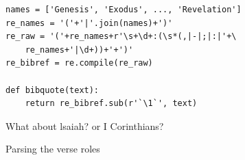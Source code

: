 \documentclass{beamer}
\begin{document}
\begin{frame}[fragile]
    
\begin{verbatim}
names = ['Genesis', 'Exodus', ..., 'Revelation']
re_names = '('+'|'.join(names)+')'
re_raw = '('+re_names+r'\s+\d+:(\s*(,|-|;|:|'+\
    re_names+'|\d+))+'+')'
re_bibref = re.compile(re_raw)

def bibquote(text):
    return re_bibref.sub(r'`\1`', text)
\end{verbatim}

What about lsaiah? or I Corinthians?

\end{frame}

\begin{frame}{Parsing the verse roles}

\end{frame}
\end{document}
